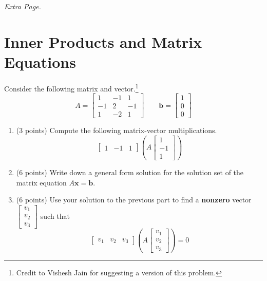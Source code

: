 \documentclass{article}
\theoremstyle{remark}
\newcommand{\vv}[1]{\mathbf{#1}}
\begin{document}
\pagebreak
\noindent\textit{Extra Page.}

\pagebreak
\section{Inner Products and Matrix Equations}

Consider the following matrix and vector.\footnote{Credit to Vishesh Jain for suggesting a version of this problem.}
\begin{displaymath}
  A =
  \begin{bmatrix}
    1 & -1 & 1 \\
    -1 & 2 & -1 \\
    1 & -2 & 1
  \end{bmatrix}
  \qquad
  \vv b =
  \begin{bmatrix}
    1 \\ 0 \\ 0
  \end{bmatrix}
\end{displaymath}
\begin{enumerate}
\item (3 points) Compute the following matrix-vector multiplications.
  \begin{displaymath}
    \begin{bmatrix}
      1 & -1 & 1
    \end{bmatrix}
    \left(
    A
    \begin{bmatrix}
      1 \\ -1 \\ 1
    \end{bmatrix}
    \right)
  \end{displaymath}
\item (6 points) Write down a general form solution for the solution set of the  matrix equation $A \vv x = \vv b$.
\item (6 points) Use your solution to the previous part to find a \textbf{nonzero} vector $\begin{bmatrix} v_1 \\ v_2 \\ v_3 \end{bmatrix}$ such that
  \begin{displaymath}
    \begin{bmatrix}
      v_1 & v_2 & v_3
    \end{bmatrix}
    \left(A
    \begin{bmatrix}
      v_1 \\ v_2 \\ v_3
    \end{bmatrix}\right)
    = 0
  \end{displaymath}
\end{enumerate}
\end{document}

